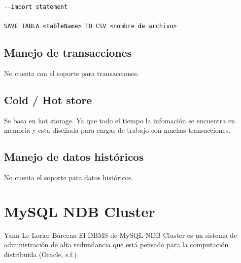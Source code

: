 \documentclass{acmart}
\begin{document}
\begin{verbatim}
--import statement

SAVE TABLA <tableName> TO CSV <nombre de archivo>
\end{verbatim}

\subsection{Manejo de transacciones}

No cuenta con el soporte para transacciones.

\subsection{Cold / Hot store}

Se basa en hot storage. Ya que todo el tiempo la infomación se encuentra en memoria y esta diseñada para cargas de trabajo con muchas transacciones.

\subsection{Manejo de datos históricos}

No cuenta el soporte para datos históricos.

\newpage

\section{MySQL NDB Cluster}
Yann Le Lorier Bárcena
El DBMS de MySQL NDB Cluster es un sistema de administración de alta redundancia que está pensado para la computación distribuida (Oracle, s.f.)
\end{document}
